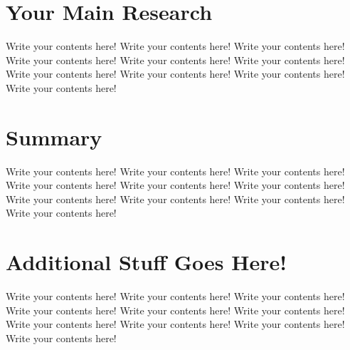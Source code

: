 \documentclass[12pt,a4paper]{ruppmath}
\begin{document}
\chapter{Your Main Research}
Write your contents here! Write your contents here! Write your contents here! Write your contents here! Write your contents here! Write your contents here! Write your contents here! Write your contents here! Write your contents here! Write your contents here!
\chapter{Summary}
Write your contents here! Write your contents here! Write your contents here! Write your contents here! Write your contents here! Write your contents here! Write your contents here! Write your contents here! Write your contents here! Write your contents here!
\appendix
\chapter{Additional Stuff Goes Here!}
Write your contents here! Write your contents here! Write your contents here! Write your contents here! Write your contents here! Write your contents here! Write your contents here! Write your contents here! Write your contents here! Write your contents here!
\clearpage
{}
\nocite{*}


\end{document}
